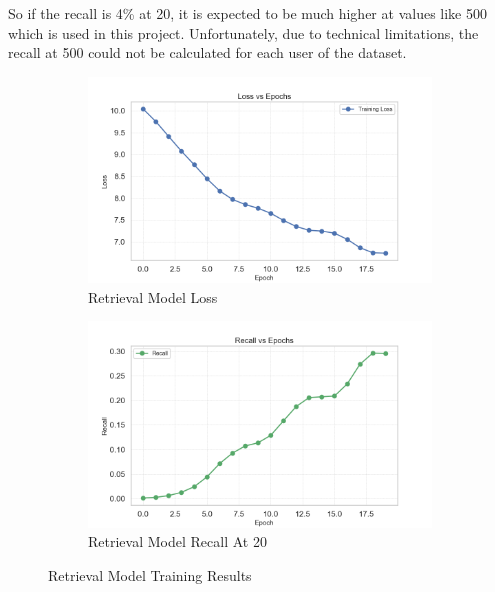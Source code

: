 So if the recall is 4\% at 20, it is expected to be much higher at values like 500 which is used in this project.
Unfortunately, due to technical limitations, the recall at 500 could not be calculated for each user of the dataset.

\begin{figure}[H]
    \centering
    \begin{subfigure}{.5\textwidth}
        \centering
        \includegraphics[width=0.95\linewidth]{assets/training_loss.png}
        \caption[Retrieval Model Loss]{Retrieval Model Loss}
        \label{fig:RetrievalModelLoss}
    \end{subfigure}%
    \begin{subfigure}{.5\textwidth}
        \centering
        \includegraphics[width=0.95\linewidth]{assets/recall_epochs.png}
        \caption[Retrieval Model Recall]{Retrieval Model Recall At 20}
        \label{fig:RetrievalModelRecall}
    \end{subfigure}
    \caption[Retrieval Model Training]{Retrieval Model Training Results}
    \label{fig:RetrievalModelTraining}
\end{figure}


